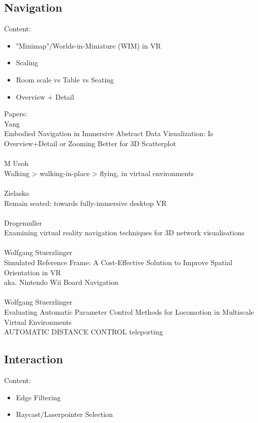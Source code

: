 \subsection{Navigation}
Content:
\begin{itemize}
    \item "Minimap"/Worlds-in-Miniature (WIM) in VR
    \item Scaling
    \item Room scale vs Table vs Seating
    \item Overview + Detail 
\end{itemize}
Papers: \\
Yang\\
Embodied Navigation in Immersive Abstract Data Visualization:
Is Overview+Detail or Zooming Better for 3D Scatterplot\\
\\
M Usoh\\
Walking > walking-in-place > flying, in virtual environments\\
\\
Zielasko\\
Remain seated: towards fully-immersive desktop VR\\
\\
Drogemuller\\
Examining virtual reality navigation techniques for 3D network visualisations\\
\\
Wolfgang Stuerzlinger\\
Simulated Reference Frame: A Cost-Effective Solution to Improve Spatial Orientation in VR\\
aka. Nintendo Wii Board Navigation\\
\\
Wolfgang Stuerzlinger\\
Evaluating Automatic Parameter Control Methods for Locomotion in Multiscale Virtual Environments\\
AUTOMATIC DISTANCE CONTROL teleporting\\

\subsection{Interaction}
Content: 
\begin{itemize}
    \item Edge Filtering
    \item Raycast/Laserpointer Selection
\end{itemize}

